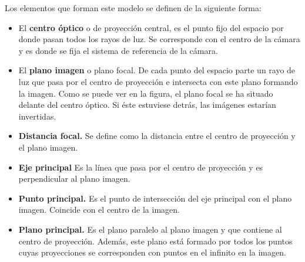 Los elementos que forman este modelo se definen de la siguiente forma:
\begin{itemize}
\item El \textbf{centro óptico} o de proyección central, es el punto fijo del espacio por donde pasan todos los rayos de luz. Se corresponde con el centro de la cámara y es donde se fija el sistema de referencia de la cámara.
\item El \textbf{plano imagen} o plano focal. De cada punto del espacio parte un rayo de luz que pasa por el centro de proyección e intersecta con este plano formando la imagen. Como se puede ver en la figura, el plano focal se ha situado delante del centro óptico. Si éste estuviese detrás, las imágenes estarían invertidas.
\item \textbf{Distancia focal.} Se define como la distancia entre el centro de proyección y el plano imagen.
\item \textbf{Eje principal} Es la línea que pasa por el centro de proyección y es perpendicular al plano imagen.
\item \textbf{Punto principal.} Es el punto de intersección del eje principal con el plano imagen. Coincide con el centro de la imagen.
\item \textbf{Plano principal.} Es el plano paralelo al plano imagen y que contiene al centro de proyección. Además, este plano está formado por todos los puntos cuyas proyecciones se corresponden con puntos en el infinito en la imagen.
\end{itemize}




